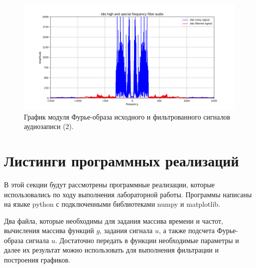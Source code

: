\documentclass[a4paper, 12pt]{article}
\begin{document}
    \begin{figure}[H]
        \centering
        \includegraphics[scale=0.48]{abs_u_U_audio_v2.png}
        \captionsetup{skip=0pt}
        \caption{График модуля Фурье-образа исходного и фильтрованного сигналов аудиозаписи (2).}
        \label{fig:fig116}
    \end{figure}

    
    \section{Листинги программных реализаций}
    В этой секции будут рассмотрены программные реализации, которые использовались по ходу выполнения лабораторной работы.
    Программы написаны на языке python с подключенными библиотеками numpy и matplotlib.


    Два файла, которые необходимы для задания массива времени и частот, вычисления массива функций $g$, задания
    сигнала $u$, а также подсчета Фурье-образа сигнала $u$. Достаточно передать в функции необходимые параметры и
    далее их результат можно использовать для выполнения фильтрации и построения графиков.
\end{document}
